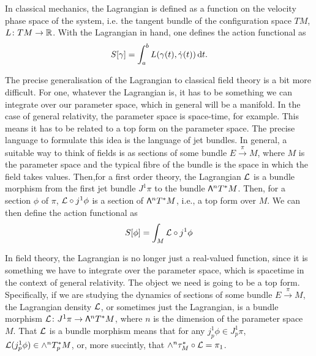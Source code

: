 \documentclass[../main.tex]{subfiles}
\begin{document}
In classical mechanics, the Lagrangian is defined as a function on the velocity phase
space of the system, i.e. the tangent bundle of the configuration space \( TM \), \( L
\colon TM \to \mathbb{R} \). With the Lagrangian in hand, one defines the action functional as
\begin{equation*}
	S[\gamma] = \int_a^b L(\gamma(t), \dot{\gamma}(t)) \,\mathrm{d} t. 
\end{equation*}

The precise generalisation of the Lagrangian to classical field theory is a bit more
difficult. For one, whatever the Lagrangian is, it has to be something we can integrate
over our parameter space, which in general will be a manifold. In the case of general
relativity, the parameter space is space-time, for example. This  means it has to be
related to a top form on the parameter space. The precise language to formulate this idea
is the language of jet bundles. In general, a suitable way to think of fields is as
sections of some bundle \( E \xrightarrow{\pi} M \), where \( M \) is the parameter space
and the typical fibre of the bundle is the space in which the field takes values. Then,for
a first order theory, the Lagrangian \( \mathcal{L} \) is a bundle morphism from the first jet bundle \(
J^1\pi \) to the bundle \( \mathsf{\Lambda}^n T^\ast M \). Then, for a section \( \phi \) of \( \pi
\), \( \mathcal{L} \circ j^1 \phi \) is a section of \( \mathsf{\Lambda}^n T^\ast M \), i.e., a top form over
\( M \). We can then define the action functional as
\begin{equation*}
	S[\phi] = \int_M \mathcal{L} \circ j^1 \phi
\end{equation*}



In field theory, the Lagrangian is no longer just a real-valued function, since it is
something we have to integrate over the parameter space, which is spacetime in the context
of general relativity. The object we need is going to be a top form. Specifically, if we
are studying the dynamics of sections of some bundle \( E \xrightarrow{\pi} M \), the
Lagrangian density \( \mathcal{L} \), or sometimes just the Lagrangian, is a bundle morphism \( \mathcal{L}
\colon J^1\pi \to \mathsf{\Lambda}^n T^\ast M \), where \( n \) is the dimension of the parameter
space \( M \). That \( \mathcal{L} \) is a bundle morphism means that for any \( j_p^1 \phi \in
J^1_p \pi \), \( \mathcal{L}(j_p^1 \phi) \in \wedge^n T^\ast_p M \), or, more succintly, that \(
\wedge^n \tau_M^\ast \circ \mathcal{L} = \pi_1 \). 
\end{document}
